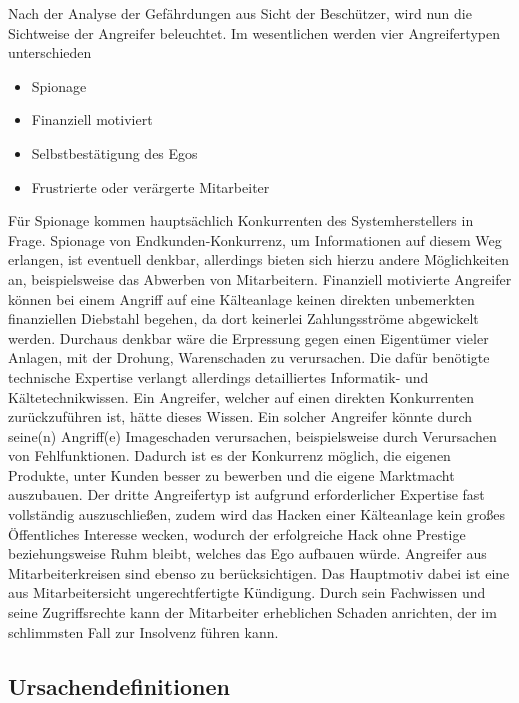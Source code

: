 \documentclass[11pt,a4paper]{report}
\begin{document}
Nach der Analyse der Gefährdungen aus Sicht der Beschützer, wird nun die Sichtweise der Angreifer beleuchtet. Im wesentlichen werden vier Angreifertypen unterschieden \cite[s.~256]{gutmann}\cite{emp_sabo}

\begin{itemize}[leftmargin=*]
\item Spionage
\item Finanziell motiviert
\item Selbstbestätigung des Egos
\item Frustrierte oder verärgerte Mitarbeiter
\end{itemize}

Für Spionage kommen hauptsächlich Konkurrenten des Systemherstellers in Frage. Spionage von Endkunden-Konkurrenz, um Informationen auf diesem Weg erlangen, ist eventuell denkbar, allerdings bieten sich hierzu andere Möglichkeiten an, beispielsweise das Abwerben von Mitarbeitern. Finanziell motivierte Angreifer können bei einem Angriff auf eine Kälteanlage keinen direkten unbemerkten finanziellen Diebstahl begehen, da dort keinerlei Zahlungsströme abgewickelt werden. Durchaus denkbar wäre die Erpressung gegen einen Eigentümer vieler Anlagen, mit der Drohung, Warenschaden zu verursachen. Die dafür benötigte technische Expertise verlangt allerdings detailliertes Informatik- und Kältetechnikwissen. Ein Angreifer, welcher auf einen direkten Konkurrenten zurückzuführen ist, hätte dieses Wissen. Ein solcher Angreifer könnte durch seine(n) Angriff(e) Imageschaden verursachen, beispielsweise durch Verursachen von Fehlfunktionen. Dadurch ist es der Konkurrenz möglich, die eigenen Produkte, unter Kunden besser zu bewerben und die eigene Marktmacht auszubauen. Der dritte Angreifertyp ist aufgrund erforderlicher Expertise fast vollständig auszuschließen, zudem wird das Hacken einer Kälteanlage kein großes Öffentliches Interesse wecken, wodurch der erfolgreiche Hack ohne Prestige beziehungsweise Ruhm bleibt, welches das Ego aufbauen würde. Angreifer aus Mitarbeiterkreisen sind ebenso zu berücksichtigen. Das Hauptmotiv dabei ist eine aus Mitarbeitersicht ungerechtfertigte Kündigung. Durch sein Fachwissen und seine Zugriffsrechte kann der Mitarbeiter erheblichen Schaden anrichten, der im schlimmsten Fall zur Insolvenz führen kann.

\subsection{Ursachendefinitionen}
\end{document}
